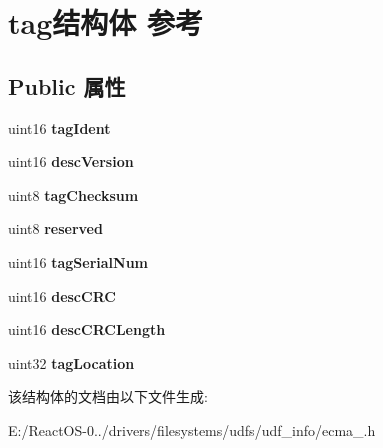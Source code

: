 \hypertarget{structtag}{}\section{tag结构体 参考}
\label{structtag}
\subsection*{Public 属性}
\begin{DoxyCompactItemize}
\item 
\mbox{\label{structtag_ad69f3840862cefb7b39d24152e467932}} 
uint16 {\bfseries tag\+Ident}
\item 
\mbox{\label{structtag_a8bc0bbdec7f20ebcbc85fa4d3c8d2990}} 
uint16 {\bfseries desc\+Version}
\item 
\mbox{\label{structtag_a6a0c7649c0dd3285bdd728475eaf50e0}} 
uint8 {\bfseries tag\+Checksum}
\item 
\mbox{\label{structtag_a1539f55aaef86bc331a07f5828303cbc}} 
uint8 {\bfseries reserved}
\item 
\mbox{\label{structtag_a4b862554e2e3d7c2f2eb37664f969538}} 
uint16 {\bfseries tag\+Serial\+Num}
\item 
\mbox{\label{structtag_aa8aecaf0376bacf5e3b5e7027ab7013a}} 
uint16 {\bfseries desc\+C\+RC}
\item 
\mbox{\label{structtag_aa1b7407f3865a3f2488cd509ec4a3c63}} 
uint16 {\bfseries desc\+C\+R\+C\+Length}
\item 
\mbox{\label{structtag_a93d7bae222cf098cbd6f460cb1d56ad3}} 
uint32 {\bfseries tag\+Location}
\end{DoxyCompactItemize}


该结构体的文档由以下文件生成\+:\begin{DoxyCompactItemize}
\item 
E\+:/\+React\+O\+S-\/0../drivers/filesystems/udfs/udf\+\_\+info/ecma\+\_.\+h\end{DoxyCompactItemize}
